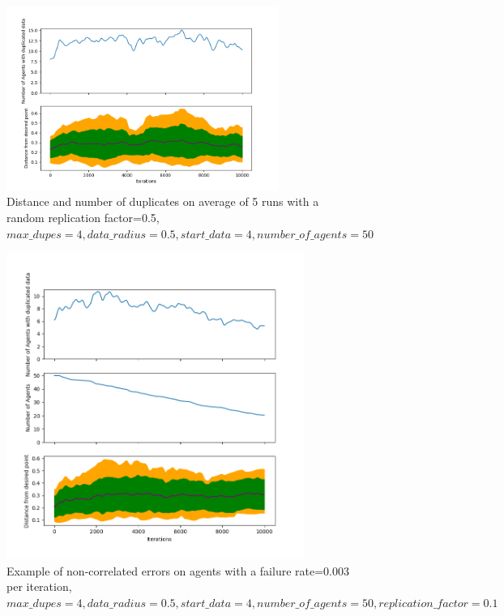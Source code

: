 \documentclass{UoYCSproject}
\begin{document}
\begin{figure}[htb]
\label{fig:Data4}
\begin{center}
\centering
\includegraphics[height=6cm]{"./SimpleSuicideReplication_n50_r0.5_c1_m4_repchance0.5_avg5.png"}
\caption{Distance and number of duplicates on average of 5 runs with a random replication factor=0.5, \(max\_dupes=4, data\_radius=0.5, start\_data=4, number\_of\_agents=50\)}
\end{center}
\end{figure}

\begin{figure}[htb]
\label{fig:Data5}
\begin{center}
\centering
\includegraphics[height=10cm]{"./Non_correlated_errors_test1.png"}
\caption{Example of non-correlated errors on agents with a failure rate=0.003 per iteration, \(max\_dupes=4, data\_radius=0.5, start\_data=4, number\_of\_agents=50,  replication\_factor=0.1\)}
\end{center}
\end{figure}
\end{document}
